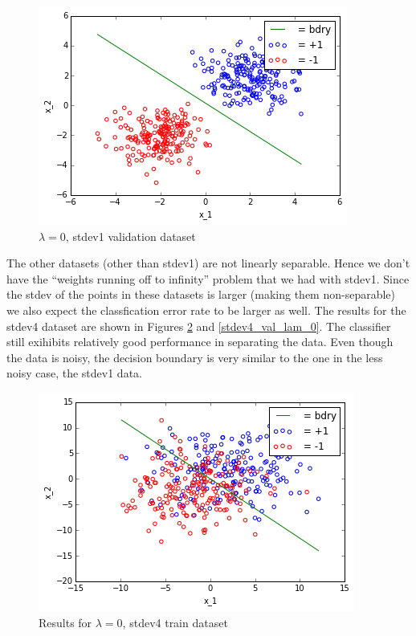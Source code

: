 \documentclass[10pt]{article}
\begin{document}
\begin{figure}
 \centering
 \includegraphics[scale=0.5]{stdev1_val_lam_0.png}
 
 \caption{$\lambda = 0$, stdev1 validation dataset}
 \label{stdev1_val_lam_0}
 \end{figure}

The other datasets (other than stdev1) are not linearly separable. Hence we don't have the ``weights running off to infinity'' problem that we had with stdev1. Since the stdev of the points in these datasets is larger (making them non-separable) we also expect the classfication error rate to be larger as well. The results for the stdev4 dataset are shown in Figures \ref{stdev4_train_lam_0} and \ref{stdev4_val_lam_0}. The classifier still exihibits relatively good performance in separating the data. Even though the data is noisy, the decision boundary is very similar to the one in the less noisy case, the stdev1 data.
\begin{figure}
 \centering
 \includegraphics[scale=0.5]{stdev4_train_lam_0.png}
 
 \caption{Results for $\lambda = 0$, stdev4 train dataset}
 \label{stdev4_train_lam_0}
 \end{figure}
\end{document}
